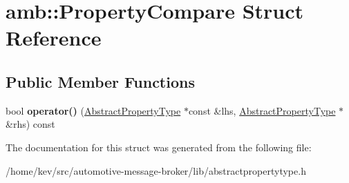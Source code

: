 \hypertarget{structamb_1_1PropertyCompare}{\section{amb\+:\+:Property\+Compare Struct Reference}
\label{structamb_1_1PropertyCompare}
}
\subsection*{Public Member Functions}
\begin{DoxyCompactItemize}
\item 
\hypertarget{structamb_1_1PropertyCompare_a35a52d2d6771dc476570a47947ed2631}{bool {\bfseries operator()} (\hyperlink{classAbstractPropertyType}{Abstract\+Property\+Type} $\ast$const \&lhs, \hyperlink{classAbstractPropertyType}{Abstract\+Property\+Type} $\ast$\&rhs) const }\label{structamb_1_1PropertyCompare_a35a52d2d6771dc476570a47947ed2631}

\end{DoxyCompactItemize}


The documentation for this struct was generated from the following file\+:\begin{DoxyCompactItemize}
\item 
/home/kev/src/automotive-\/message-\/broker/lib/abstractpropertytype.\+h\end{DoxyCompactItemize}

